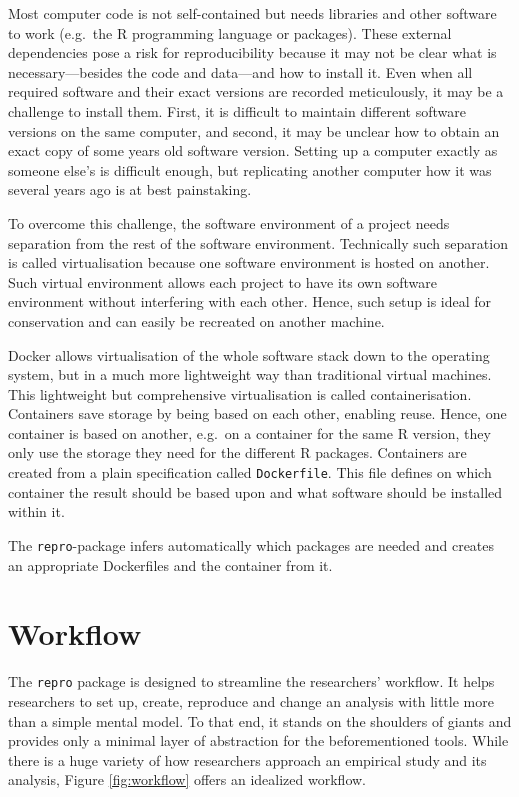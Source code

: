 \documentclass[12pt,a4paper,]{article}
\begin{document}
Most computer code is not self-contained but needs libraries and other software to work (e.g.~the R programming language or packages).
These external dependencies pose a risk for reproducibility because it may not be clear what is necessary---besides the code and data---and how to install it.
Even when all required software and their exact versions are recorded meticulously, it may be a challenge to install them.
First, it is difficult to maintain different software versions on the same computer, and second, it may be unclear how to obtain an exact copy of some years old software version.
Setting up a computer exactly as someone else's is difficult enough, but replicating another computer how it was several years ago is at best painstaking.

To overcome this challenge, the software environment of a project needs separation from the rest of the software environment. Technically such separation is called virtualisation because one software environment is hosted on another. Such virtual environment allows each project to have its own software environment without interfering with each other. Hence, such setup is ideal for conservation and can easily be recreated on another machine.

Docker allows virtualisation of the whole software stack down to the operating system, but in a much more lightweight way than traditional virtual machines. This lightweight but comprehensive virtualisation is called containerisation. Containers save storage by being based on each other, enabling reuse. Hence, one container is based on another, e.g.~on a container for the same R version, they only use the storage they need for the different R packages. Containers are created from a plain specification called \texttt{Dockerfile}. This file defines on which container the result should be based upon and what software should be installed within it.

The \texttt{repro}-package infers automatically which packages are needed and creates an appropriate Dockerfiles and the container from it.

\hypertarget{workflow}{%
\section{Workflow}\label{workflow}}

The \texttt{repro} package is designed to streamline the researchers' workflow.
It helps researchers to set up, create, reproduce and change an analysis with little more than a simple mental model.
To that end, it stands on the shoulders of giants and provides only a minimal layer of abstraction for the beforementioned tools.
While there is a huge variety of how researchers approach an empirical study and its analysis, Figure \ref{fig:workflow} offers an idealized workflow.
\end{document}
